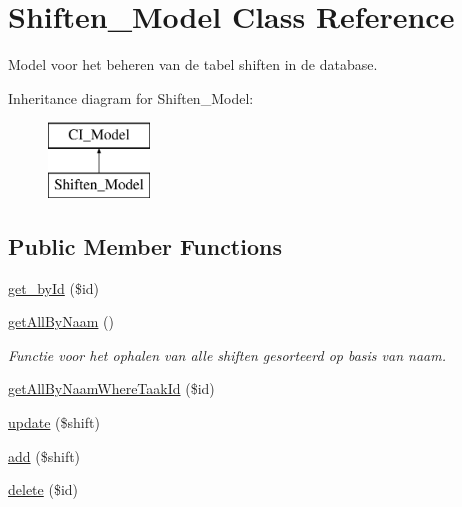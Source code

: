 \hypertarget{class_shiften___model}{}\section{Shiften\+\_\+\+Model Class Reference}
\label{class_shiften___model}


Model voor het beheren van de tabel shiften in de database.  


Inheritance diagram for Shiften\+\_\+\+Model\+:\begin{figure}[H]
\begin{center}
\leavevmode
\includegraphics[height=2.000000cm]{class_shiften___model}
\end{center}
\end{figure}
\subsection*{Public Member Functions}
\begin{DoxyCompactItemize}
\item 
\mbox{\hyperlink{class_shiften___model_a0e222557a11630559c7eaa6ca29c55a6}{get\+\_\+by\+Id}} (\$id)
\item 
\mbox{\label{class_shiften___model_aad336432fa42862a23f7c8b772e46f64}} 
\mbox{\hyperlink{class_shiften___model_aad336432fa42862a23f7c8b772e46f64}{get\+All\+By\+Naam}} ()
\begin{DoxyCompactList}\small\item\em Functie voor het ophalen van alle shiften gesorteerd op basis van naam. \end{DoxyCompactList}\item 
\mbox{\hyperlink{class_shiften___model_a23921f9ceba4ae6768237864469d1cf5}{get\+All\+By\+Naam\+Where\+Taak\+Id}} (\$id)
\item 
\mbox{\hyperlink{class_shiften___model_af5e1c7d324bab167ecaa3e827161ec13}{update}} (\$shift)
\item 
\mbox{\hyperlink{class_shiften___model_ae95a20c13c92700b673c4b850a084b85}{add}} (\$shift)
\item 
\mbox{\hyperlink{class_shiften___model_aa8ebb0f37babc9dbfc4c026f0a73d6e6}{delete}} (\$id)
\end{DoxyCompactItemize}


